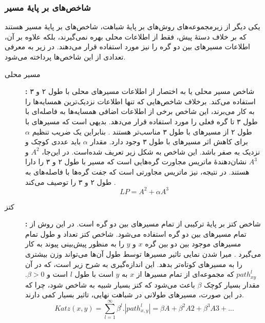 \subsubsection{شاخص‌های بر پایهٔ مسیر}
یکی دیگر از زیرمجموعه‌های روش‌های بر پایهٔ شباهت، شاخص‌های بر پایهٔ مسیر هستند که بر خلاف دستهٔ پیش، فقط از اطلاعات محلی بهره نمی‌گیرند، بلکه علاوه بر آن، اطلاعات مسیرهای بین دو گره را نیز مورد استفاده قرار می‌دهند. در زیر به معرفی تعدادی از این شاخص‌ها پرداخته می‌شود.
\begin{description}
\item[مسیر محلی]\textbf{:}
شاخص مسیر محلی یا به اختصار  از اطلاعات مسیرهای محلی با طول ۲ و ۳ استفاده می‌کند. برخلاف شاخص‌هایی که تنها اطلاعات نزدیک‌ترین همسایه‌ها را به کار می‌برند، این شاخص برخی از اطلاعات اضافی همسایه‌ها به فاصله‌ای با طول ۳ تا گره فعلی را مورد استفاده قرار می‌دهد. بدیهی است که مسیرهای با طول ۲ از مسیرهای با طول ۳ مناسب‌تر هستند \cite{sarkar2011theoretical}. بنابراین یک ضریب تنظیم $\alpha $ برای کاهش اثر مسیرهای با طول ۳ وجود دارد. مقدار $\alpha$ باید عددی کوچک و نزدیک به صفر باشد. این شاخص به شکل زیر تعریف شده‌است. در این‌جا، $A^{2}$ و $A^{3}$ نشان‌دهندهٔ ماتریس مجاورت گره‌هایی است که مسیر با طول ۲ و ۳ را دارا هستند. در نتیجه،  نیز ماتریس مجاورتی است که جفت گره‌ها با فاصله‌های به طول ۲ و ۳ را توصیف می‌کند \cite{lu2009similarity}.
\begin{equation}
LP = A^{2}+\alpha A^{3}
\end{equation}
\item[کتز]\textbf{:}
شاخص کتز بر پایهٔ ترکیبی از تمام مسیرهای بین دو گره است. در این روش از تمام مسیرهای بین دو گره استفاده می‌شود. شاخص کتز تعداد و طول تمام مسیرهای موجود بین دو بین گره $x$ و $y$ را به منظور پیش‌بینی پیوند به کار می‌گیرد \cite{katz1953new}. میرا شدن نمایی تاثیر مسیرها توسط طول آن‌ها می‌تواند وزن بیشتری را به مسیرهای کوتاه‌تر بدهد. این اندازه‌گیری به شرح زیر است، که در آن $path^{l}_{xy}$ که مجموعه‌ای از تمام مسیرها از $x$ به $y$ است با طول $l$ است و $\beta > 0$. مقدار بسیار کوچک $\beta$ باعث می‌شود که کتز بسیار شبیه به شاخص  شود، چرا که در این صورت، مسیرهای طولانی در شباهت نهایی، تاثیر بسیار کمی دارند.
\begin{equation}
Katz(x,y)=\sum^{\infty}_{l=1}\beta^{l}.|path^{l}_{x,y}| = \beta A + \beta^{2}A{2} +\beta^{3}A{3} + ...
\end{equation}


\end{description}
